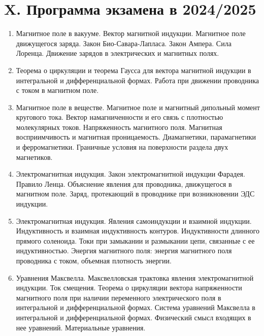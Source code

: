 \clearpage

\section{X. Программа экзамена в 2024/2025}

\begin{enumerate}

    \item Магнитное поле в вакууме. Вектор магнитной индукции. Магнитное поле движущегося 
    заряда. Закон Био-Савара-Лапласа. Закон Ампера. Сила Лоренца. Движение зарядов в 
    электрических и магнитных полях. 

    \item Теорема о циркуляции и теорема Гаусса для вектора магнитной индукции в интегральной и 
    дифференциальной формах. Работа при движении проводника с током в магнитном поле. 

    \item Магнитное поле в веществе. Магнитное поле и магнитный дипольный момент кругового тока. 
    Вектор намагниченности и его связь с плотностью молекулярных токов. Напряженность 
    магнитного поля. Магнитная восприимчивость и магнитная проницаемость. Диамагнетики, 
    парамагнетики и ферромагнетики. Граничные условия на поверхности раздела двух магнетиков. 

    \item Электромагнитная индукция. Закон электромагнитной индукции Фарадея. Правило Ленца. 
    Объяснение явления для проводника, движущегося в магнитном поле. Заряд, протекающий в 
    проводнике при возникновении ЭДС индукции. 

    \item Электромагнитная индукция. Явления самоиндукции и взаимной индукции. Индуктивность и 
    взаимная индуктивность контуров. Индуктивности длинного прямого соленоида. Токи при 
    замыкании и размыкании цепи, связанные с ее индуктивностью. Энергия магнитного поля: 
    энергия магнитного поля проводника с током, объемная плотность энергии.

    \item Уравнения Максвелла. Максвелловская трактовка явления электромагнитной индукции. Ток 
    смещения. Теорема о циркуляции вектора напряженности магнитного поля при наличии 
    переменного электрического поля в интегральной и дифференциальной формах. Система 
    уравнений Максвелла в интегральной и дифференциальной формах. Физический смысл 
    входящих в нее уравнений. Материальные уравнения.


\end{enumerate}
